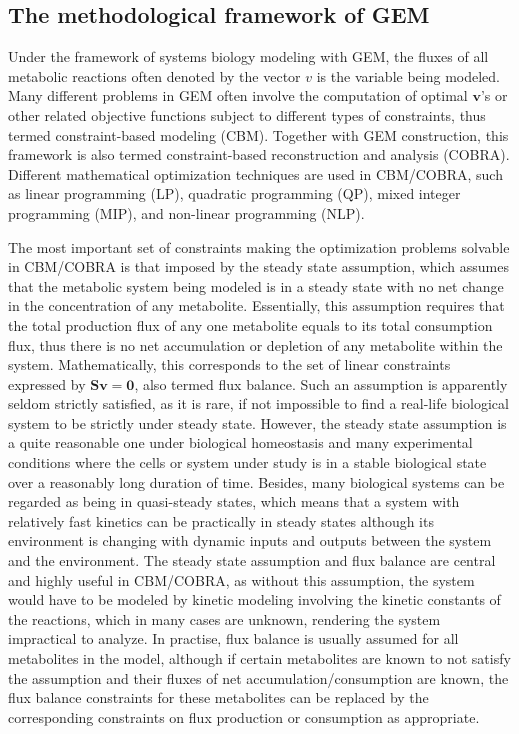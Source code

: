 \documentclass[12pt,twoside,openany,\mydriver]{thesis}  %
\begin{document}
\hypertarget{the-methodological-framework-of-gem}{%
\subsection{The methodological framework of GEM}\label{the-methodological-framework-of-gem}}

Under the framework of systems biology modeling with GEM, the fluxes of all metabolic reactions often denoted by the vector \(v\) is the variable being modeled. Many different problems in GEM often involve the computation of optimal \(\mathbf v\)'s or other related objective functions subject to different types of constraints, thus termed constraint-based modeling (CBM). Together with GEM construction, this framework is also termed constraint-based reconstruction and analysis (COBRA). Different mathematical optimization techniques are used in CBM/COBRA, such as linear programming (LP), quadratic programming (QP), mixed integer programming (MIP), and non-linear programming (NLP).

The most important set of constraints making the optimization problems solvable in CBM/COBRA is that imposed by the steady state assumption, which assumes that the metabolic system being modeled is in a steady state with no net change in the concentration of any metabolite. Essentially, this assumption requires that the total production flux of any one metabolite equals to its total consumption flux, thus there is no net accumulation or depletion of any metabolite within the system. Mathematically, this corresponds to the set of linear constraints expressed by \(\mathbf{Sv=0}\), also termed flux balance. Such an assumption is apparently seldom strictly satisfied, as it is rare, if not impossible to find a real-life biological system to be strictly under steady state. However, the steady state assumption is a quite reasonable one under biological homeostasis and many experimental conditions where the cells or system under study is in a stable biological state over a reasonably long duration of time. Besides, many biological systems can be regarded as being in quasi-steady states, which means that a system with relatively fast kinetics can be practically in steady states although its environment is changing with dynamic inputs and outputs between the system and the environment. The steady state assumption and flux balance are central and highly useful in CBM/COBRA, as without this assumption, the system would have to be modeled by kinetic modeling involving the kinetic constants of the reactions, which in many cases are unknown, rendering the system impractical to analyze. In practise, flux balance is usually assumed for all metabolites in the model, although if certain metabolites are known to not satisfy the assumption and their fluxes of net accumulation/consumption are known, the flux balance constraints for these metabolites can be replaced by the corresponding constraints on flux production or consumption as appropriate.
\end{document}
